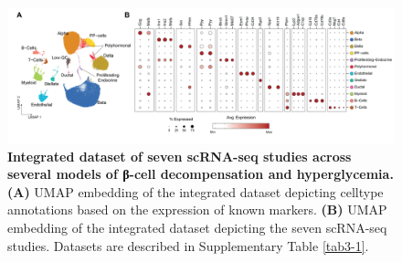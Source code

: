 



\begin{figure}[H]
\centering
\includegraphics[width=\linewidth]{Chapter5/Fig/F3-2-01.png}
\caption[Annotation of the full integrated dataset using marker genes]{\textbf{Integrated dataset of seven scRNA-seq studies across several models of β-cell decompensation and hyperglycemia.} \textbf{(A)} UMAP embedding of the integrated dataset depicting celltype annotations based on the expression of known markers. \textbf{(B)} UMAP embedding of the integrated dataset depicting the seven scRNA-seq studies. Datasets are described in Supplementary Table \ref{tab3-1}.}
\label{fig:3-2}
\end{figure}

